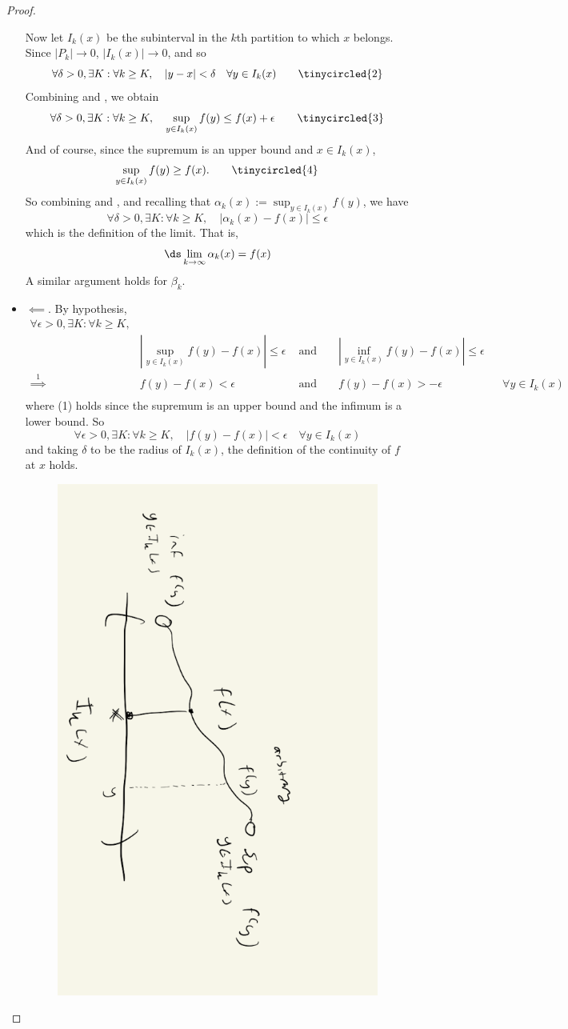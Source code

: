 \documentclass{article} %
\begin{document}
\begin{proof}
\begin{itemize}
Now let $I_k(x)$ be the subinterval in the $k$th partition to which $x$ belongs.  Since $|P_k| \to 0$, $|I_k(x)| \to 0$, and so
\[ \forall \delta>0, \exists K : \forall k \geq K, \quad  |y-x| < \delta \quad \forall y \in I_k(x) \quad \quad  \tinycircled{2} \]
Combining  and , we obtain
\[ \forall \delta>0, \exists K : \forall k \geq K, \quad  \sup_{y \in I_k(x)} f(y) \leq f(x) + \epsilon \quad \quad  \tinycircled{3}\]
And of course, since the supremum is an upper bound and $x \in I_k(x)$, 
\[ \sup_{y \in I_k(x)} f(y) \geq f(x). \quad \quad  \tinycircled{4}\]
So combining  and , and recalling that $\alpha_k(x) :=  \sup_{y \in I_k(x)} f(y)$, we have 
\[ \forall \delta>0, \exists K : \forall k \geq K, \quad  | \alpha_k(x) - f(x) | \leq  \epsilon\]
which is the definition of the limit.   That is,
\[ \ds\lim_{k \to \infty} \alpha_k(x) = f(x)\]
A similar argument holds for $\beta_k$.
\item $\boxed{\impliedby}$.  By hypothesis, 
\begin{align*}
\forall \epsilon>0, \exists K : \forall k \geq K, \\
 & | \sup_{y \in I_k(x)} f(y) - f(x) | \leq  \epsilon & \text{ and } && | \inf_{y \in I_k(x)} f(y) - f(x) | \leq  \epsilon  && \\	
 \stackrel{1}{\implies} & f(y) - f(x) < \epsilon & \text{ and } && f(y) - f(x) > -\epsilon && \forall y \in I_k(x) \\
\end{align*}
where (1) holds since the supremum is an upper bound and the infimum is a lower bound.  So 
\[ \forall \epsilon>0, \exists K : \forall k \geq K, \quad |f(y) - f(x) | < \epsilon \quad  \forall y \in I_k(x) \]
and taking $\delta$ to be the radius of $I_k(x)$, the definition of the continuity of $f$ at $x$ holds. 
\begin{figure}[H]
\centering
\includegraphics[width=.4\textwidth, angle=90]{images/continuity_from_equality_of_limits_of_upper_and_lower_functions}	
\end{figure}

\end{itemize}
\end{proof}
\end{document}
